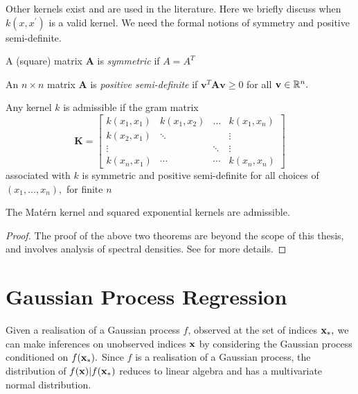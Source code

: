 Other kernels exist and are used in the literature. Here we briefly discuss when
$k(x, x^\prime)$ is a valid kernel. We need the formal notions of symmetry and
positive semi-definite.

\begin{definition}[Symmetric]\label{def:sym_mat}
    A (square) matrix $\mathbf{A}$ is \emph{symmetric} if $A = A^T$
\end{definition}

\begin{definition}\label{def:pos_def_mat}
    An $n\times n$ matrix $\mathbf{A}$ is \emph{positive semi-definite} if
    $\mathbf{v}^T\mathbf{A}\mathbf{v} \geq 0$ for all $\mathbf{v}\in\mathbb{R}^n.$
\end{definition}

\begin{theorem}
    Any kernel $k$ is admissible if the gram matrix
    $$\mathbf{K} = \begin{bmatrix}
            k(x_1, x_1) & k(x_1, x_2) & \dots  & k(x_1, x_n) \\
            k(x_2, x_1) & \ddots      &        & \vdots      \\
            \vdots      &             & \ddots & \vdots      \\
            k(x_n, x_1) & \cdots      & \cdots & k(x_n, x_n)
        \end{bmatrix}$$ associated with $k$ is symmetric and positive
    semi-definite for all choices of $(x_1, \dots, x_n),$ for finite $n$

\end{theorem}
\begin{theorem}
    The Mat\'ern kernel and squared exponential kernels are admissible.
\end{theorem}
\begin{proof}
    The proof of the above two theorems are beyond the scope of this thesis,
    and involves analysis of spectral densities.
    See \cite[chapter 4]{rasmussen_gaussian_2008} for more details.
\end{proof}

\section{Gaussian Process Regression}

Given a realisation of a Gaussian process $f$, observed at the set of indices
$\mathbf{x}_*,$ we can make inferences on unobserved indices $\mathbf{x}$ by considering the
Gaussian process conditioned on $f(\mathbf{x}_*).$
Since $f$ is a realisation of a Gaussian
process, the distribution of $f(\mathbf{x}) | f(\mathbf{x}_*)$ reduces to linear algebra
and has a multivariate normal distribution.

